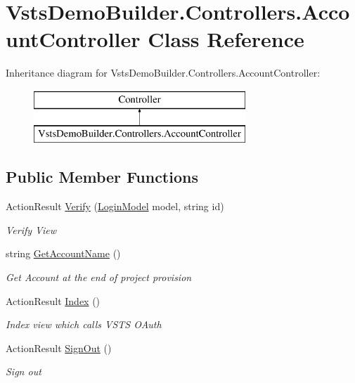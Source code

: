 \hypertarget{class_vsts_demo_builder_1_1_controllers_1_1_account_controller}{}\section{Vsts\+Demo\+Builder.\+Controllers.\+Account\+Controller Class Reference}
\label{class_vsts_demo_builder_1_1_controllers_1_1_account_controller}
Inheritance diagram for Vsts\+Demo\+Builder.\+Controllers.\+Account\+Controller\+:\begin{figure}[H]
\begin{center}
\leavevmode
\includegraphics[height=2.000000cm]{class_vsts_demo_builder_1_1_controllers_1_1_account_controller}
\end{center}
\end{figure}
\subsection*{Public Member Functions}
\begin{DoxyCompactItemize}
\item 
Action\+Result \mbox{\hyperlink{class_vsts_demo_builder_1_1_controllers_1_1_account_controller_a6d42be6f0b98a238c2575e225940ff6e}{Verify}} (\mbox{\hyperlink{class_vsts_demo_builder_1_1_models_1_1_login_model}{Login\+Model}} model, string id)
\begin{DoxyCompactList}\small\item\em Verify View \end{DoxyCompactList}\item 
string \mbox{\hyperlink{class_vsts_demo_builder_1_1_controllers_1_1_account_controller_ae8d17a5a4622885c1ae042f2cbe8103e}{Get\+Account\+Name}} ()
\begin{DoxyCompactList}\small\item\em Get Account at the end of project provision \end{DoxyCompactList}\item 
Action\+Result \mbox{\hyperlink{class_vsts_demo_builder_1_1_controllers_1_1_account_controller_ac36624619c06ea1c9e9df88c06d9a80f}{Index}} ()
\begin{DoxyCompactList}\small\item\em Index view which calls V\+S\+TS O\+Auth \end{DoxyCompactList}\item 
Action\+Result \mbox{\hyperlink{class_vsts_demo_builder_1_1_controllers_1_1_account_controller_abbf468c027b199a26ccc4a12fdad7fbe}{Sign\+Out}} ()
\begin{DoxyCompactList}\small\item\em Sign out \end{DoxyCompactList}\end{DoxyCompactItemize}


